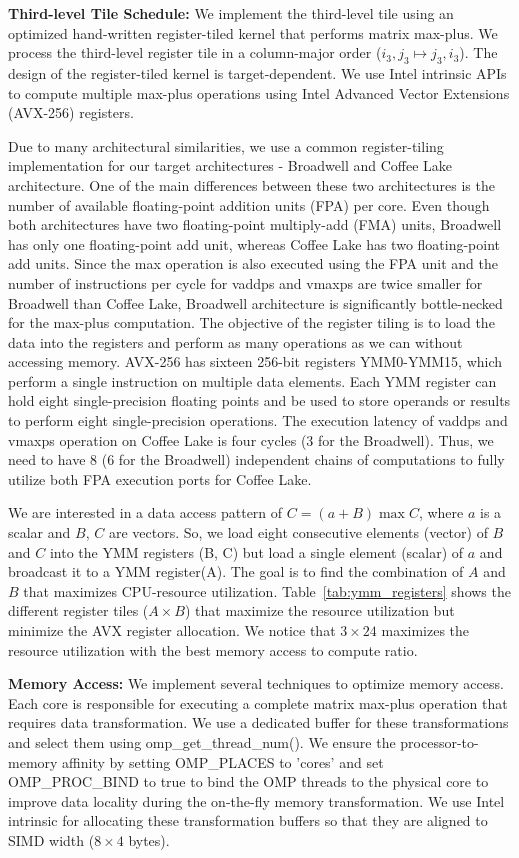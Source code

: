 \textbf{Third-level Tile Schedule:}
 We implement the third-level tile using an optimized hand-written register-tiled kernel that performs matrix max-plus. We process the third-level register tile in a column-major order ($i_{3}, j_{3} \mapsto {j_3}, i_{3}$).  The design of the register-tiled kernel is target-dependent. We use Intel intrinsic APIs to compute multiple max-plus operations using Intel Advanced Vector Extensions (AVX-256) registers.

Due to many architectural similarities, we use a common register-tiling implementation for our target architectures - Broadwell and Coffee Lake architecture. One of the main differences between these two architectures is the number of available floating-point addition units (FPA) per core. Even though both architectures have two floating-point multiply-add (FMA) units, Broadwell has only one floating-point add unit, whereas Coffee Lake has two floating-point add units. Since the max operation is also executed using the FPA unit and the number of instructions per cycle for vaddps and vmaxps are twice smaller for Broadwell than Coffee Lake,  Broadwell architecture is significantly bottle-necked for the max-plus computation. The objective of the register tiling is to load the data into the registers and perform as many operations as we can without accessing memory. AVX-256 has sixteen 256-bit registers YMM0-YMM15, which perform a single instruction on multiple data elements. Each YMM register can hold eight single-precision floating points and be used to store operands or results to perform eight single-precision operations. The execution latency of vaddps and vmaxps operation on Coffee Lake is four cycles (3 for the Broadwell). Thus, we need to have 8 (6 for the Broadwell) independent chains of computations to fully utilize both FPA execution ports for Coffee Lake.

We are interested in a data access pattern of $C = (a + B) \max C $, where $a$ is a scalar and $B$, $C$ are vectors. So, we load eight consecutive elements (vector) of $B$ and $C$ into the YMM registers (B, C) but load a single element (scalar) of $a$ and broadcast it to a YMM register(A). The goal is to find the combination of $A$ and $B$ that maximizes CPU-resource utilization. Table~\ref{tab:ymm_registers} shows the different register tiles ($ A\times B$) that maximize the resource utilization but minimize the AVX register allocation. We notice that $3 \times 24$ maximizes the resource utilization with the best memory access to compute ratio. 

\textbf{Memory Access:} We implement several techniques to optimize memory access. Each core is responsible for executing a complete matrix max-plus operation that requires data transformation. We use a dedicated buffer for these transformations and select them using omp\_get\_thread\_num(). We ensure the processor-to-memory affinity by setting OMP\_PLACES to 'cores' and set OMP\_PROC\_BIND to true to bind the OMP threads to the physical core to improve data locality during the on-the-fly memory transformation. We use Intel intrinsic for allocating these transformation buffers so that they are aligned to SIMD width ($8 \times 4$ bytes).

